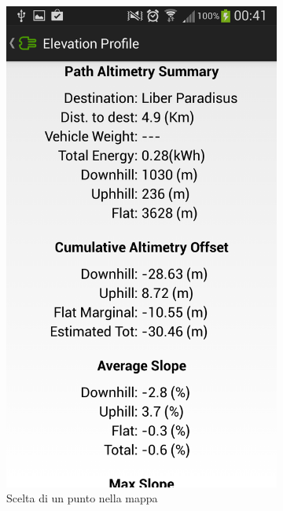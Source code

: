 \begin{figure}
\begin{subfigure}{0.45\textwidth}
		\includegraphics[width=\textwidth]{assets/mobile-app-altimetry-1.png}
		\caption{Scelta di un punto nella mappa}
		\label{fig:altimetry-1}
	\end{subfigure}
	\begin{subfigure}{0.45\textwidth}

\end{subfigure}
\end{figure}
